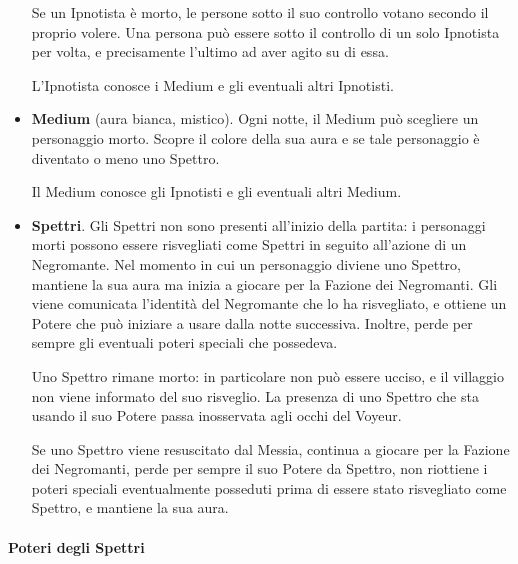 \documentclass[a4paper,10pt]{article}
\begin{document}
\begin{itemize}
 Se un Ipnotista è morto, le persone sotto il suo controllo votano secondo il proprio volere.
 Una persona può essere sotto il controllo di un solo Ipnotista per volta, e precisamente l'ultimo ad aver agito su di essa.

 L'Ipnotista conosce i Medium e gli eventuali altri Ipnotisti.

 \item {\bf Medium} (aura bianca, mistico). Ogni notte, il Medium può scegliere un personaggio morto. Scopre il colore della sua aura e se tale personaggio è diventato o meno uno Spettro.

 Il Medium conosce gli Ipnotisti e gli eventuali altri Medium.

 \item {\bf Spettri}. Gli Spettri non sono presenti all'inizio della partita: i personaggi morti possono essere risvegliati come Spettri in seguito all'azione di un Negromante.
 Nel momento in cui un personaggio diviene uno Spettro, mantiene la sua aura ma inizia a giocare per la Fazione dei Negromanti. Gli viene comunicata l'identità del Negromante che lo ha risvegliato, e ottiene un Potere che può iniziare a usare dalla notte successiva. Inoltre, perde per sempre gli eventuali poteri speciali che possedeva.
 
 Uno Spettro rimane morto: in particolare non può essere ucciso, e il villaggio non viene informato del suo risveglio.
 La presenza di uno Spettro che sta usando il suo Potere passa inosservata agli occhi del Voyeur.
 
 Se uno Spettro viene resuscitato dal Messia, continua a giocare per la Fazione dei Negromanti, perde per sempre il suo Potere da Spettro, non riottiene i poteri speciali eventualmente posseduti prima di essere stato risvegliato come Spettro, e mantiene la sua aura.
 
\end{itemize}


\paragraph{Poteri degli Spettri}
\end{document}
